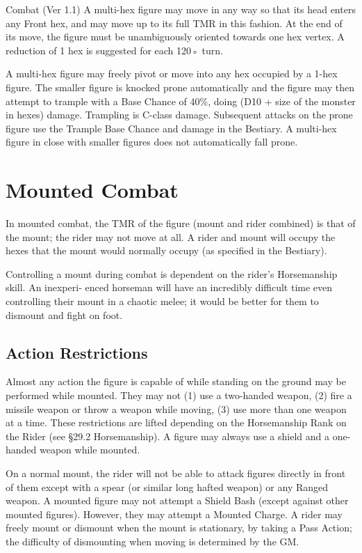 \begin{Chapter}{Combat (Ver 1.1)}
A multi-hex figure may move in any way so that its head enters any
Front hex, and may move up to its full TMR in this fashion.  At the
end of its move, the figure must be unambiguously oriented towards one
hex vertex.  A reduction of 1 hex is suggested for each 120◦ turn.

A multi-hex figure may freely pivot or move into any hex occupied by a
1-hex figure.  The smaller figure is knocked prone automatically and
the figure may then attempt to trample with a Base Chance of 40\%,
doing (D10 + size of the monster in hexes) damage.  Trampling is
C-class damage.  Subsequent attacks on the prone figure use the
Trample Base Chance and damage in the Bestiary.  A multi-hex figure in
close with smaller figures does not automatically fall prone.

\section{Mounted Combat}

In mounted combat, the TMR of the figure (mount and rider combined) is
that of the mount; the rider may not move at all.  A rider and mount
will occupy the hexes that the mount would normally occupy (as
specified in the Bestiary).

Controlling a mount during combat is dependent on the rider’s
Horsemanship skill.  An inexperi- enced horseman will have an
incredibly difficult time even controlling their mount in a chaotic
melee; it would be better for them to dismount and fight on foot.

\subsection{Action Restrictions}

Almost any action the figure is capable of while standing on the
ground may be performed while mounted.  They may not (1) use a
two-handed weapon, (2) fire a missile weapon or throw a weapon while
moving, (3) use more than one weapon at a time.  These restrictions
are lifted depending on the Horsemanship Rank on the Rider (see §29.2
Horsemanship).  A figure may always use a shield and a one-handed
weapon while mounted.

On a normal mount, the rider will not be able to attack figures
directly in front of them except with a spear (or similar long hafted
weapon) or any Ranged weapon.  A mounted figure may not attempt a
Shield Bash (except against other mounted figures).  However, they may
attempt a Mounted Charge.  A rider may freely mount or dismount when
the mount is stationary, by taking a Pass Action; the difficulty of
dismounting when moving is determined by the GM.


\end{Chapter}
